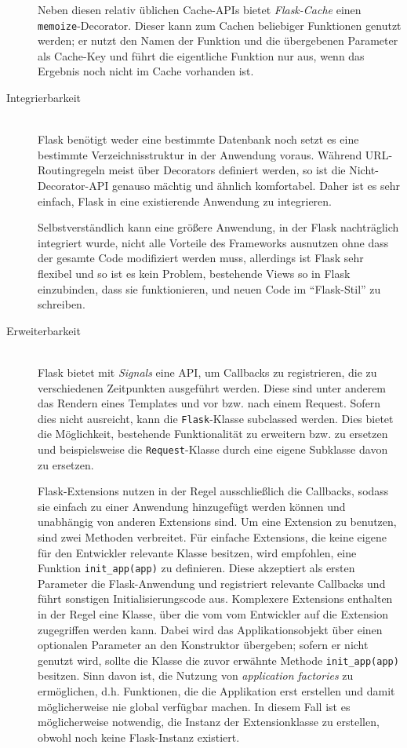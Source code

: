 \begin{description}
Neben diesen relativ üblichen Cache-APIs bietet \emph{Flask-Cache} einen
\lstinline{memoize}-Decorator. Dieser kann zum Cachen beliebiger Funktionen genutzt werden; er nutzt
den Namen der Funktion und die übergebenen Parameter als Cache-Key und führt die eigentliche
Funktion nur aus, wenn das Ergebnis noch nicht im Cache vorhanden ist.


\item[Integrierbarkeit] \hfill \\
Flask benötigt weder eine bestimmte Datenbank noch setzt es eine bestimmte Verzeichnisstruktur in
der Anwendung voraus. Während URL-Routingregeln meist über Decorators definiert werden, so ist die
Nicht-Decorator-API genauso mächtig und ähnlich komfortabel. Daher ist es sehr einfach, Flask in
eine existierende Anwendung zu integrieren.

Selbstverständlich kann eine größere Anwendung, in der Flask nachträglich integriert wurde, nicht
alle Vorteile des Frameworks ausnutzen ohne dass der gesamte Code modifiziert werden muss,
allerdings ist Flask sehr flexibel und so ist es kein Problem, bestehende Views so in Flask
einzubinden, dass sie funktionieren, und neuen Code im \enquote{Flask-Stil} zu schreiben.


\item[Erweiterbarkeit] \hfill \\
Flask bietet mit \emph{Signals} eine API, um Callbacks zu registrieren, die zu verschiedenen
Zeitpunkten ausgeführt werden. Diese sind unter anderem das Rendern eines Templates und vor bzw.
nach einem Request. Sofern dies nicht ausreicht, kann die \lstinline{Flask}-Klasse subclassed
werden. Dies bietet die Möglichkeit, bestehende Funktionalität zu erweitern bzw. zu ersetzen und
beispielsweise die \lstinline{Request}-Klasse durch eine eigene Subklasse davon zu ersetzen.

Flask-Extensions nutzen in der Regel ausschließlich die Callbacks, sodass sie einfach zu einer
Anwendung hinzugefügt werden können und unabhängig von anderen Extensions sind. Um eine Extension zu
benutzen, sind zwei Methoden verbreitet. Für einfache Extensions, die keine eigene für den
Entwickler relevante Klasse besitzen, wird empfohlen, eine Funktion \lstinline{init_app(app)} zu
definieren. Diese akzeptiert als ersten Parameter die Flask-Anwendung und registriert relevante
Callbacks und führt sonstigen Initialisierungscode aus. Komplexere Extensions enthalten in der Regel
eine Klasse, über die vom vom Entwickler auf die Extension zugegriffen werden kann. Dabei wird das
Applikationsobjekt über einen optionalen Parameter an den Konstruktor übergeben; sofern er nicht
genutzt wird, sollte die Klasse die zuvor erwähnte Methode \lstinline{init_app(app)} besitzen. Sinn
davon ist, die Nutzung von \emph{application factories} zu ermöglichen, d.h. Funktionen, die die
Applikation erst erstellen und damit möglicherweise nie global verfügbar machen. In diesem Fall ist
es möglicherweise notwendig, die Instanz der Extensionklasse zu erstellen, obwohl noch keine
Flask-Instanz existiert.


\end{description}
